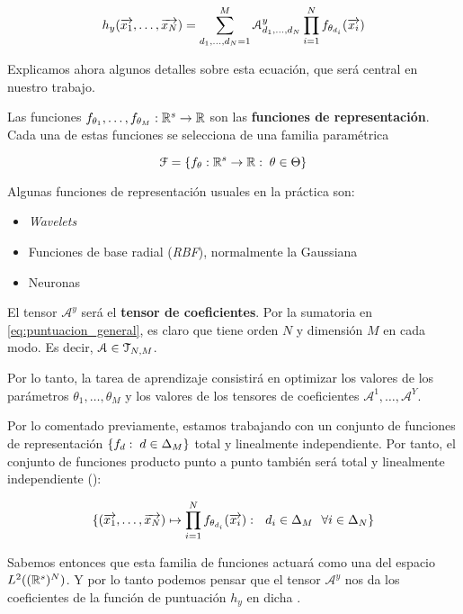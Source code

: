 \begin{equation} \label{eq:puntuacion_general}
	h_y(\overrightarrow{x_1}, \ldots, \overrightarrow{x_N}) = \sum_{d_1, \ldots, d_N = 1}^{M} \mathcal{A}^y_{d_1, \ldots, d_N} \prod_{i = 1}^N f_{\theta_{d_i}}(\overrightarrow{x_i})
\end{equation}

Explicamos ahora algunos detalles sobre esta ecuación, que será central en nuestro trabajo.

Las funciones $f_{\theta_1}, \ldots, f_{\theta_M}: \mathbb{R}^s \to \mathbb{R}$ son las \textbf{funciones de representación}. Cada una de estas funciones se selecciona de una familia paramétrica

$$\mathcal{F} = \{ f_{\theta}: \mathbb{R}^s \to \mathbb{R}: \; \theta \in \Theta \}$$

Algunas funciones de representación usuales en la práctica son:

\begin{itemize}
	\item \textit{Wavelets}
	\item Funciones de base radial (\textit{RBF}), normalmente la Gaussiana
	\item Neuronas
\end{itemize}

El tensor $\mathcal{A}^y$ será el \textbf{tensor de coeficientes}. Por la sumatoria en \eqref{eq:puntuacion_general}, es claro que tiene orden $N$ y dimensión $M$ en cada modo. Es decir, $\mathcal{A} \in \mathcal{T}_{N, M}$.

Por lo tanto, la tarea de aprendizaje consistirá en optimizar los valores de los parámetros $\theta_1, \ldots, \theta_M$ y los valores de los tensores de coeficientes $\mathcal{A}^1, \ldots, \mathcal{A}^Y$.

\begin{observacion}
	Por lo comentado previamente, estamos trabajando con un conjunto de funciones de representación $\{ f_d: \; d \in \Delta_{M} \}$ total y linealmente independiente. Por tanto, el conjunto de funciones producto punto a punto también será total y linealmente independiente ():

	\begin{equation}
		\{ (\overrightarrow{x_1}, \ldots, \overrightarrow{x_N}) \mapsto \prod_{i = 1}^{N} f_{\theta_{d_i}} (\overrightarrow{x_i}): \ \  d_i \in \Delta_{M} \ \  \forall i \in \Delta_{N}  \}
	\end{equation}


	Sabemos entonces que esta familia de funciones actuará como una  del espacio $L^2((\mathbb{R}^s)^N)$. Y por lo tanto podemos pensar que el tensor $\mathcal{A}^y$ nos da los coeficientes de la función de puntuación $h_y$ en dicha .
\end{observacion}


